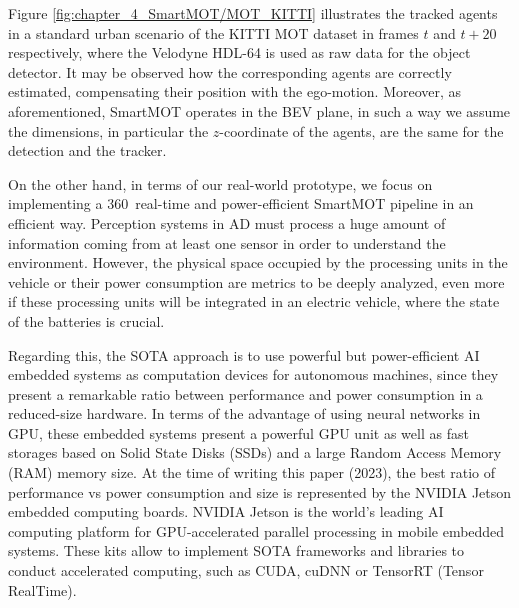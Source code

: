 Figure \ref{fig:chapter_4_SmartMOT/MOT_KITTI} illustrates the tracked agents in a standard urban scenario of the KITTI \ac{MOT} dataset in frames $t$ and $t+20$ respectively, where the Velodyne HDL-64 is used as raw data for the object detector. It may be observed how the corresponding agents are correctly estimated, compensating their position with the ego-motion. Moreover, as aforementioned, SmartMOT operates in the \ac{BEV} plane, in such a way we assume the dimensions, in particular the $z$-coordinate of the agents, are the same for the detection and the tracker.


On the other hand, in terms of our real-world prototype, we focus on implementing a 360\degree~real-time and power-efficient SmartMOT pipeline in an efficient way. Perception systems in \ac{AD} must process a huge amount of information coming from at least one sensor in order to understand the environment. However, the physical space occupied by the processing units in the vehicle or their power consumption are metrics to be deeply analyzed, even more if these processing units will be integrated in an electric vehicle, where the state of the batteries is crucial. 

Regarding this, the \ac{SOTA} approach is to use powerful but power-efficient \ac{AI} embedded systems as computation devices for autonomous machines, since they present a remarkable ratio between performance and power consumption in a reduced-size hardware. In terms of the advantage of using neural networks in \ac{GPU}, these embedded systems present a powerful \ac{GPU} unit as well as fast storages based on Solid State Disks (SSDs) and a large Random Access Memory (RAM) memory size. At the time of writing this paper (2023), the best ratio of performance vs power consumption and size is represented by the NVIDIA Jetson embedded computing boards. NVIDIA Jetson is the world's leading \ac{AI} computing platform for \ac{GPU}-accelerated parallel processing in mobile embedded systems. These kits allow to implement \ac{SOTA} frameworks and libraries to conduct accelerated computing, such as \ac{CUDA}, cuDNN or TensorRT (Tensor RealTime). 

